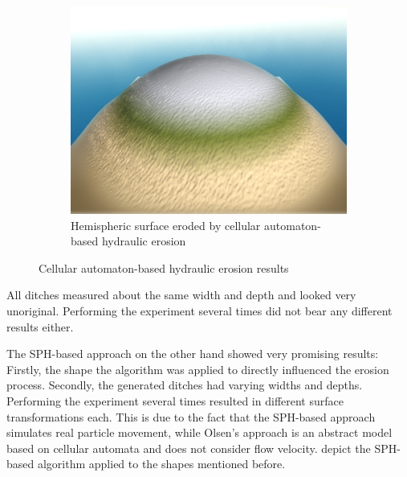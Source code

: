 \documentclass[11pt,a4paper,twoside,openright]{report}
\begin{document}
\begin{figure}[h]
\begin{subfigure}[b]{0.32\textwidth}
    \includegraphics[width=\textwidth]{hydro-10mins-46k-iterations-hemisphere.png}
    \caption{Hemispheric surface eroded by cellular automaton-based hydraulic erosion}
    \label{fig:hydro3}
  \end{subfigure}
  \caption{Cellular automaton-based hydraulic erosion results}
\end{figure}

\noindent All ditches measured about the same width and depth and looked very unoriginal. Performing the experiment several times did not bear any different results either.

The SPH-based approach on the other hand showed very promising results: Firstly, the shape the algorithm was applied to directly influenced the erosion process. Secondly, the generated ditches had varying widths and depths. Performing the experiment several times resulted in different surface transformations each. This is due to the fact that the SPH-based approach simulates real particle movement, while Olsen's approach is an abstract model based on cellular automata and does not consider flow velocity.  depict the SPH-based algorithm applied to the shapes mentioned before.
\end{document}
